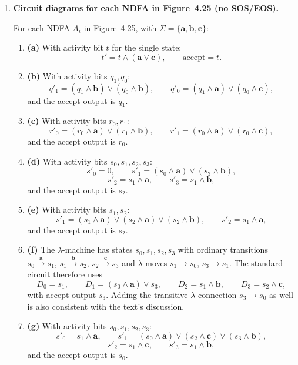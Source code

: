 \begin{enumerate}[{4.}1.]
\item \textbf{Circuit diagrams for each NDFA in Figure~4.25 (no SOS/EOS).}

For each NDFA $A_i$ in Figure~4.25, with $\Sigma=\{\pmb{a},\pmb{b},\pmb{c}\}$:
\begin{enumerate}[1.]
  \item \textbf{(a)} With activity bit $t$ for the single state:
  \[
    t'=t\wedge(\pmb{a}\vee\pmb{c}),\qquad \text{accept}=t.
  \]

  \item \textbf{(b)} With activity bits $q_1,q_0$:
  \[
    q'_1=(q_1\wedge \pmb{b})\vee(q_0\wedge \pmb{b}),\qquad
    q'_0=(q_1\wedge \pmb{a})\vee(q_0\wedge \pmb{c}),
  \]
  and the accept output is $q_1$.

  \item \textbf{(c)} With activity bits $r_0,r_1$:
  \[
    r'_0=(r_0\wedge \pmb{a})\vee(r_1\wedge \pmb{b}),\qquad
    r'_1=(r_0\wedge \pmb{a})\vee(r_0\wedge \pmb{c}),
  \]
  and the accept output is $r_0$.

  \item \textbf{(d)} With activity bits $s_0,s_1,s_2,s_3$:
  \[
    s'_0=0,\qquad
    s'_1=(s_0\wedge \pmb{a})\vee(s_3\wedge \pmb{b}),
  \]
  \[
    s'_2=s_1\wedge \pmb{a},\qquad
    s'_3=s_1\wedge \pmb{b},
  \]
  and the accept output is $s_2$.

  \item \textbf{(e)} With activity bits $s_1,s_2$:
  \[
    s'_1=(s_1\wedge \pmb{a})\vee(s_2\wedge \pmb{a})\vee(s_2\wedge \pmb{b}),
    \qquad
    s'_2=s_1\wedge \pmb{a},
  \]
  and the accept output is $s_2$.

  \item \textbf{(f)} The $\lambda$-machine has states $s_0,s_1,s_2,s_3$ with
  ordinary transitions $s_0\xrightarrow{\pmb{a}}s_1$,
  $s_1\xrightarrow{\pmb{b}}s_2$, $s_2\xrightarrow{\pmb{c}}s_3$ and
  $\lambda$-moves $s_1\to s_0$, $s_3\to s_1$.  The standard circuit therefore
  uses
  \[
    D_0=s_1,\qquad
    D_1=(s_0\wedge \pmb{a})\vee s_3,\qquad
    D_2=s_1\wedge \pmb{b},\qquad
    D_3=s_2\wedge \pmb{c},
  \]
  with accept output $s_3$.  Adding the transitive $\lambda$-connection
  $s_3\to s_0$ as well is also consistent with the text's discussion.

  \item \textbf{(g)} With activity bits $s_0,s_1,s_2,s_3$:
  \[
    s'_0=s_1\wedge \pmb{a},\qquad
    s'_1=(s_0\wedge \pmb{a})\vee(s_2\wedge \pmb{c})\vee(s_3\wedge \pmb{b}),
  \]
  \[
    s'_2=s_1\wedge \pmb{c},\qquad
    s'_3=s_1\wedge \pmb{b},
  \]
  and the accept output is $s_0$.
\end{enumerate}


\end{enumerate}
